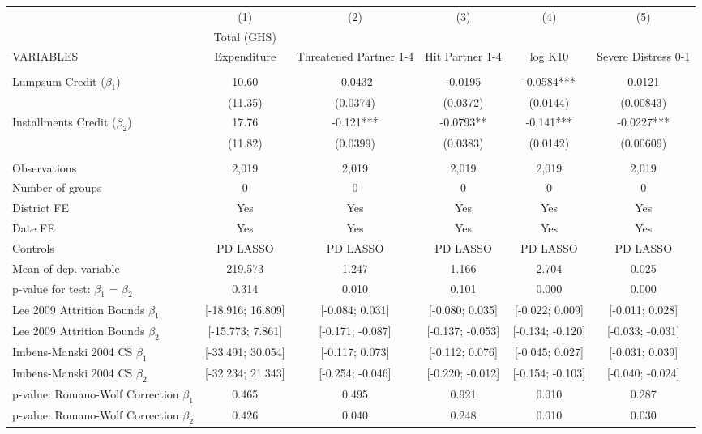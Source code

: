 \begin{tabular}{lccccc} \hline
 & (1) & (2) & (3) & (4) & (5) \\
 & Total (GHS) &  &  &  &  \\
VARIABLES & Expenditure & Threatened Partner 1-4 & Hit Partner 1-4 & log K10 & Severe Distress 0-1 \\ \hline
 &  &  &  &  &  \\
Lumpsum Credit ($\beta_1$) & 10.60 & -0.0432 & -0.0195 & -0.0584*** & 0.0121 \\
 & (11.35) & (0.0374) & (0.0372) & (0.0144) & (0.00843) \\
Installments Credit ($\beta_2$) & 17.76 & -0.121*** & -0.0793** & -0.141*** & -0.0227*** \\
 & (11.82) & (0.0399) & (0.0383) & (0.0142) & (0.00609) \\
 &  &  &  &  &  \\
Observations & 2,019 & 2,019 & 2,019 & 2,019 & 2,019 \\
Number of groups & 0 & 0 & 0 & 0 & 0 \\
District FE & Yes & Yes & Yes & Yes & Yes \\
Date FE & Yes & Yes & Yes & Yes & Yes \\
Controls & PD LASSO & PD LASSO & PD LASSO & PD LASSO & PD LASSO \\
Mean of dep. variable & 219.573 & 1.247 & 1.166 & 2.704 & 0.025 \\
p-value for test: $\beta_1$ = $\beta_2$ & 0.314 & 0.010 & 0.101 & 0.000 & 0.000 \\
Lee 2009 Attrition Bounds $\beta_1$ & [-18.916; 16.809] & [-0.084; 0.031] & [-0.080; 0.035] & [-0.022; 0.009] & [-0.011; 0.028] \\
Lee 2009 Attrition Bounds $\beta_2$ & [-15.773; 7.861] & [-0.171; -0.087] & [-0.137; -0.053] & [-0.134; -0.120] & [-0.033; -0.031] \\
Imbens-Manski 2004 CS $\beta_1$ & [-33.491; 30.054] & [-0.117; 0.073] & [-0.112; 0.076] & [-0.045; 0.027] & [-0.031; 0.039] \\
Imbens-Manski 2004 CS $\beta_2$ & [-32.234; 21.343] & [-0.254; -0.046] & [-0.220; -0.012] & [-0.154; -0.103] & [-0.040; -0.024] \\
p-value: Romano-Wolf Correction $\beta_1$ & 0.465 & 0.495 & 0.921 & 0.010 & 0.287 \\
 p-value: Romano-Wolf Correction $\beta_2$ & 0.426 & 0.040 & 0.248 & 0.010 & 0.030 \\ \hline
\end{tabular}

